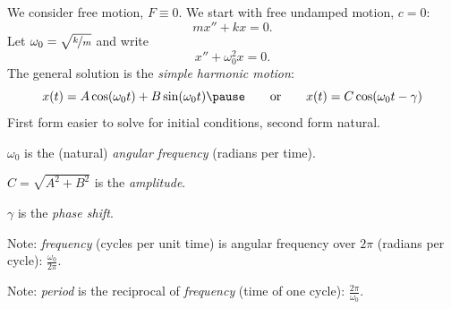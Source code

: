 \documentclass[10pt,aspectratio=169]{beamer}
\begin{document}
\begin{frame}
We consider free motion, $F \equiv 0$.
\pause
We start with free undamped motion, $c = 0$:
\[
mx'' + kx = 0 .
\]
\pause
Let $\omega_0 = \sqrt{\nicefrac{k}{m}}$ and write
\[
x'' + \omega_0^2 x = 0 .
\]
\pause
The general solution is the \emph{simple harmonic motion}:
\[
x(t) = A \cos (\omega_0 t) + B \sin (\omega_0 t) 
\pause
\qquad
\text{or}
\qquad
x(t) = C \cos (\omega_0 t - \gamma) 
\]
\pause
First form easier to solve for initial conditions, second form
natural.

\medskip
\pause

$\omega_0$ is the (natural) \emph{angular frequency} (radians per time).

\pause
$C = \sqrt{A^2+B^2}$ is the \emph{amplitude}.

\pause
$\gamma$ is the \emph{phase shift}.

\medskip
\pause

Note:
\emph{frequency} (cycles per unit time) is
angular frequency over $2\pi$ (radians per cycle):
$\frac{\omega_0}{2\pi}$.

\pause

Note:
\emph{period} is the reciprocal of \emph{frequency} (time of one cycle):
$\frac{2\pi}{\omega_0}$.
\end{frame}
\end{document}

